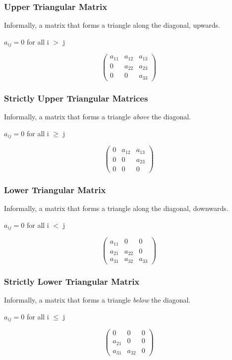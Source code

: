 \documentclass{article}
\begin{document}
\subsubsection{Upper Triangular Matrix}
Informally, a matrix that forms a triangle along the diagonal, upwards.

$a_{ij} = 0$ for all i $>$ j


\[
\begin{pmatrix}
a_{11} & a_{12} & a_{13} \\
0 & a_{22} & a_{23} \\
0 & 0 & a_{33} 
\end{pmatrix}
\]

\subsubsection{Strictly Upper Triangular Matrices}
Informally, a matrix that forms a triangle \textit{above} the diagonal.

$a_{ij} = 0$ for all i $\geq$ j

\[
\begin{pmatrix}
0 & a_{12} & a_{13} \\
0 & 0 & a_{23} \\
0 & 0 & 0 
\end{pmatrix}
\]

\subsubsection{Lower Triangular Matrix}
Informally, a matrix that forms a triangle along the diagonal, downwards.

$a_{ij} = 0$ for all i $<$ j

\[
\begin{pmatrix}
a_{11} & 0 & 0 \\
a_{21} & a_{22} & 0 \\
a_{31} & a_{32} & a_{33} 
\end{pmatrix}
\]


\subsubsection{Strictly Lower Triangular Matrix}
Informally, a matrix that forms a triangle \textit{below} the diagonal.

$a_{ij} = 0$ for all i $\leq$ j

\[
\begin{pmatrix}
0 & 0 & 0 \\
a_{21} & 0 & 0 \\
a_{31} & a_{32} & 0 
\end{pmatrix}
\]
\end{document}

